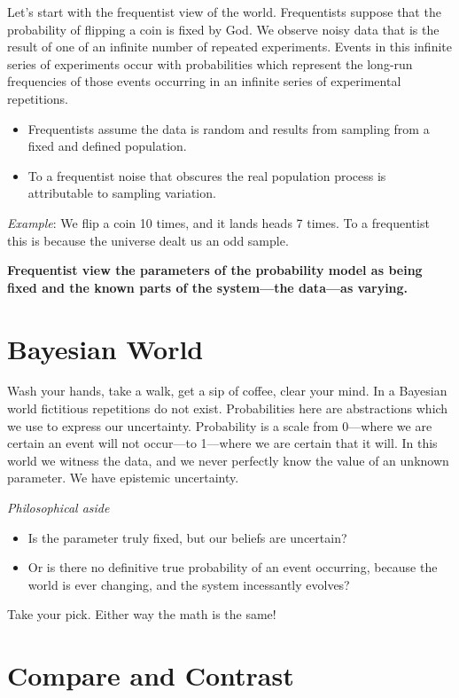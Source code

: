 \documentclass[]{article}
\begin{document}
Let's start with the frequentist view of the world. Frequentists suppose
that the probability of flipping a coin is fixed by God. We observe
noisy data that is the result of one of an infinite number of repeated
experiments. Events in this infinite series of experiments occur with
probabilities which represent the long-run frequencies of those events
occurring in an infinite series of experimental repetitions.
\begin{itemize}
	\item Frequentists assume the data is random and results from sampling from a fixed and defined population. 
	\item To a frequentist noise that obscures the real population process is attributable to sampling variation.
\end{itemize}

\emph{Example}: We flip a coin 10 times, and it lands heads 7 times. To a frequentist this is because the universe dealt us an odd sample.

\textbf{Frequentist view the parameters of the probability model as
being fixed and the known parts of the system---the data---as varying.}

\section{Bayesian World}

Wash your hands, take a walk, get a sip of coffee, clear your mind. In a
Bayesian world fictitious repetitions do not exist. Probabilities here
are abstractions which we use to express our uncertainty. Probability is
a scale from 0---where we are certain an event will not occur---to
1---where we are certain that it will. In this world we witness the data,
and we never perfectly know the value of an unknown parameter. We have
epistemic uncertainty.

\emph{Philosophical aside} 
\begin{itemize}
\item Is the parameter truly fixed, but our beliefs are uncertain? 
\item Or is there no definitive true probability of an event occurring, because the world is ever changing, and the system incessantly evolves? 
\end{itemize}
Take your pick. Either way the math is the same!

\section{Compare and Contrast}
\end{document}
